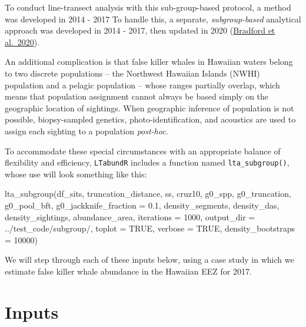 \documentclass[
]{book}
\newenvironment{Shaded}{\begin{snugshade}}{\end{snugshade}}
\newcommand{\AttributeTok}[1]{\textcolor[rgb]{0.77,0.63,0.00}{#1}}
\newcommand{\ConstantTok}[1]{\textcolor[rgb]{0.00,0.00,0.00}{#1}}
\newcommand{\DecValTok}[1]{\textcolor[rgb]{0.00,0.00,0.81}{#1}}
\newcommand{\FloatTok}[1]{\textcolor[rgb]{0.00,0.00,0.81}{#1}}
\newcommand{\FunctionTok}[1]{\textcolor[rgb]{0.00,0.00,0.00}{#1}}
\newcommand{\NormalTok}[1]{#1}
\newcommand{\StringTok}[1]{\textcolor[rgb]{0.31,0.60,0.02}{#1}}
\begin{document}
To conduct line-transect analysis with this sub-group-based protocol, a method was developed in 2014 - 2017
To handle this, a separate, \emph{subgroup-based} analytical approach was developed in 2014 - 2017, then updated in 2020 (\href{https://www.fisheries.noaa.gov/inport/item/59592}{Bradford et al.~2020}).

An additional complication is that false killer whales in Hawaiian waters belong to two discrete populations -- the Northwest Hawaiian Islands (NWHI) population and a pelagic population -- whose ranges partially overlap, which means that population assignment cannot always be based simply on the geographic location of sightings. When geographic inference of population is not possible, biopsy-sampled genetics, photo-identification, and acoustics are used to assign each sighting to a population \emph{post-hoc}.

To accommodate these special circumstances with an appropriate balance of flexibility and efficiency, \texttt{LTabundR} includes a function named \texttt{lta\_subgroup()}, whose use will look something like this:

\begin{Shaded}
\begin{Highlighting}[]
\FunctionTok{lta\_subgroup}\NormalTok{(df\_sits,}
\NormalTok{             truncation\_distance,}
\NormalTok{             ss,}
\NormalTok{             cruz10,}
\NormalTok{             g0\_spp,}
\NormalTok{             g0\_truncation,}
\NormalTok{             g0\_pool\_bft,}
             \AttributeTok{g0\_jackknife\_fraction =} \FloatTok{0.1}\NormalTok{,}
\NormalTok{             density\_segments,}
\NormalTok{             density\_das,}
\NormalTok{             density\_sightings,}
\NormalTok{             abundance\_area,}
             \AttributeTok{iterations =} \DecValTok{1000}\NormalTok{,}
             \AttributeTok{output\_dir =} \StringTok{\textquotesingle{}../test\_code/subgroup/\textquotesingle{}}\NormalTok{,}
             \AttributeTok{toplot =} \ConstantTok{TRUE}\NormalTok{,}
             \AttributeTok{verbose =} \ConstantTok{TRUE}\NormalTok{,}
             \AttributeTok{density\_bootstraps =} \DecValTok{10000}\NormalTok{)}
\end{Highlighting}
\end{Shaded}

We will step through each of these inputs below, using a case study in which we estimate false killer whale abundance in the Hawaiian EEZ for 2017.

\hypertarget{inputs-1}{%
\section*{Inputs}\label{inputs-1}}
\end{document}
